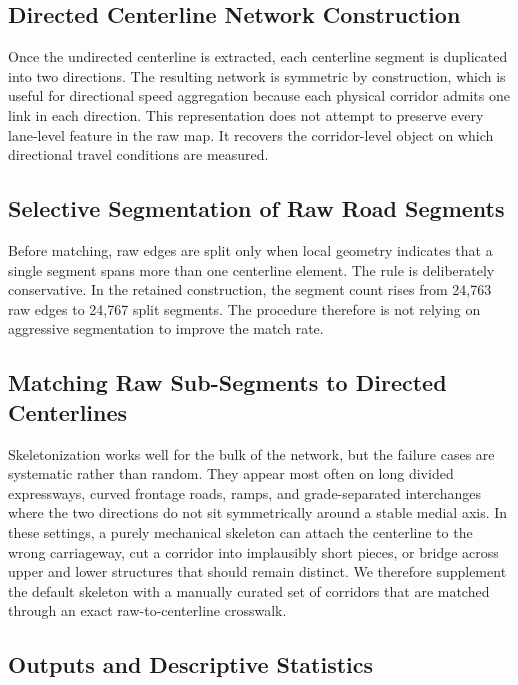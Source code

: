 \documentclass[12pt]{article}
\begin{document}
	\subsection{Directed Centerline Network Construction}
	
	Once the undirected centerline is extracted, each centerline segment is duplicated into two directions. The resulting network is symmetric by construction, which is useful for directional speed aggregation because each physical corridor admits one link in each direction. This representation does not attempt to preserve every lane-level feature in the raw map. It recovers the corridor-level object on which directional travel conditions are measured.
	
	\subsection{Selective Segmentation of Raw Road Segments}
	
	Before matching, raw edges are split only when local geometry indicates that a single segment spans more than one centerline element. The rule is deliberately conservative. In the retained construction, the segment count rises from 24,763 raw edges to 24,767 split segments. The procedure therefore is not relying on aggressive segmentation to improve the match rate.
	
	\subsection{Matching Raw Sub-Segments to Directed Centerlines}
	
	Skeletonization works well for the bulk of the network, but the failure cases are systematic rather than random. They appear most often on long divided expressways, curved frontage roads, ramps, and grade-separated interchanges where the two directions do not sit symmetrically around a stable medial axis. In these settings, a purely mechanical skeleton can attach the centerline to the wrong carriageway, cut a corridor into implausibly short pieces, or bridge across upper and lower structures that should remain distinct. We therefore supplement the default skeleton with a manually curated set of corridors that are matched through an exact raw-to-centerline crosswalk.
	
	\subsection{Outputs and Descriptive Statistics}
	
\end{document}
